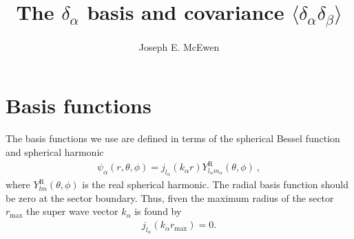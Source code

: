\documentclass[11pt, oneside]{article}   	%
\title{The $\delta_\alpha$ basis and covariance $\langle \delta_\alpha \delta_\beta \rangle$}
\author{Joseph E. McEwen}
\begin{document}
\maketitle

\section{Basis functions}
The basis functions we use are defined in terms of the spherical Bessel function and spherical harmonic
\begin{align} 
\psi_\alpha(r, \theta, \phi) = j_{l_\alpha}(k_\alpha r) Y^\text{R}_{l_\alpha m_\alpha}(\theta, \phi) ~, 
\end{align} 
where $Y^\text{R}_{lm}(\theta, \phi) $ is the real spherical harmonic. The radial basis function should be zero at the sector boundary. Thus, fiven the maximum radius of the sector $r_\text{max}$ the super wave vector $k_\alpha$ is found by 
\begin{align}
 j_{l_\alpha}(k_\alpha r_\text{max})=0.
 \end{align}
 
\end{document}
